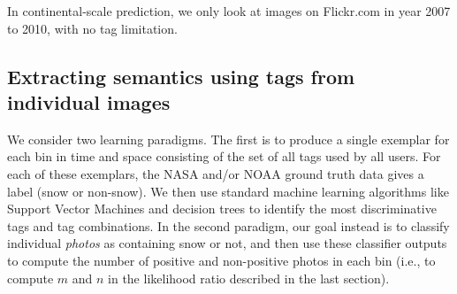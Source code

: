 In continental-scale prediction, we only look at images on Flickr.com in year 2007 to 2010, with no tag limitation. 

%




\subsection{Extracting semantics using tags from individual images}

We consider two learning paradigms. The first
is to produce a single exemplar for each bin in time and space
consisting of the set of all tags used by all users. For each of these
exemplars, the NASA and/or NOAA ground truth data gives a label (snow
or non-snow). We then use standard machine learning algorithms like
Support Vector Machines and decision trees to identify the most
discriminative tags and tag combinations. In the second paradigm, our
goal instead is to classify individual \textit{photos} as containing
snow or not, and then use these classifier outputs to compute the
number of positive and non-positive photos in each bin (i.e., to
compute $m$ and $n$ in the likelihood ratio described in the last
section).





